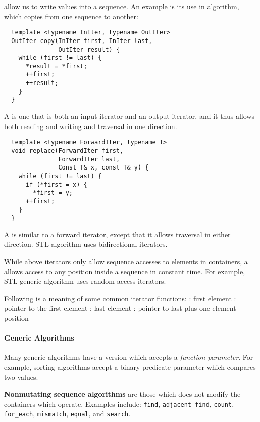 \documentclass{memo}
\begin{document}
 allow us to write values into a sequence. An example is
its use in  algorithm, which copies from one sequence to another:

\begin{verbatim}
  template <typename InIter, typename OutIter>
  OutIter copy(InIter first, InIter last,
               OutIter result) {
    while (first != last) {
      *result = *first;
      ++first;
      ++result;
    }
  }
\end{verbatim}

A  is one that is both an input iterator and an output
iterator, and it thus allows both reading and writing and traversal in one
direction. 

\begin{verbatim}
  template <typename ForwardIter, typename T>
  void replace(ForwardIter first, 
               ForwardIter last, 
               Const T& x, const T& y) {
    while (first != last) {
      if (*first = x) {
        *first = y;
      ++first;
    }
  }
\end{verbatim}

A  is similar to a forward iterator, except that it
allows traversal in either direction. STL  algorithm uses
bidirectional iterators.

While above iterators only allow sequence accesses to elements in containers, 
a  allows access to any position inside a sequence
in constant time. For example, STL generic  algorithm uses
random access iterators. 

Following is a meaning of some common iterator functions:
\bit
\w {}: first element
\w {}: pointer to the first element
\w {}: last element
\w {}: pointer to last-plus-one element position
\eit

\paragraph{Generic Algorithms}
Many generic algorithms have a version which accepts a {\em function
  parameter\/}. For example, sorting algorithms accept a binary predicate
parameter which compares two values.


{\bf Nonmutating sequence algorithms} are those which does not modify the
containers which operate. Examples include: \verb+find+, \verb+adjacent_find+,
\verb+count+, \verb+for_each+, \verb+mismatch+, \verb+equal+, and
\verb+search+. 
\end{document}
